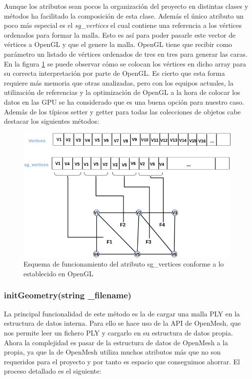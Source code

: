 Aunque los atributos sean pocos la organización del proyecto en distintas clases y métodos ha facilitado la composición de esta clase. Además el único atributo un poco más especial es el \textit{sg\_vertices} el cual contiene una referencia a los vértices ordenados para formar la malla. Esto es así para poder pasarle este vector de vértices a OpenGL y que el genere la malla. OpenGL tiene que recibir como parámetro un listado de vértices ordenados de tres en tres para generar las caras. En la figura \ref{fig:sgvertices.png} se puede observar cómo se colocan los vértices en dicho array para su correcta interpretación por parte de OpenGL. Es cierto que esta forma requiere más memoria que otras analizadas, pero con los equipos actuales, la utilización de referencias y la optimización de OpenGL a la hora de colocar los datos en las GPU se ha considerado que es una buena opción para nuestro caso. Además de los típicos setter y getter para todas las colecciones de objetos cabe destacar los siguientes métodos:\\

\begin{figure} %
	\centering
	\includegraphics[scale=0.4]{imagenes/sgvertices.png} 
	\caption{Esquema de funcionamiento del atributo sg\_vertices conforme a lo establecido en OpenGL} \label{fig:sgvertices.png}
\end{figure}

\subsubsection*{initGeometry(string \_filename)}

La principal funcionalidad de este método es la de cargar una malla PLY en la estructura de datos interna. Para ello se hace uso de la API de OpenMesh, que nos permite leer un fichero PLY y cargarlo en su estructura de datos propia. Ahora la complejidad es pasar de la estructura de datos de OpenMesh a la propia, ya que la de OpenMesh utiliza muchos atributos más que no son requeridos para el proyecto y por tanto es espacio que conseguimos ahorrar. El proceso detallado es el siguiente:

